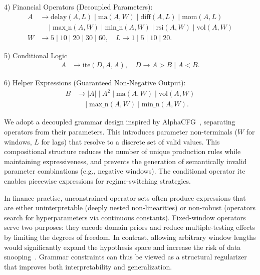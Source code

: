 4) Financial Operators (Decoupled Parameters):
\begin{align}
\mathit{A} &\rightarrow \text{delay}(\mathit{A}, \mathit{L}) \mid \text{ma}(\mathit{A}, \mathit{W}) \mid \text{diff}(\mathit{A}, \mathit{L}) \mid \text{mom}(\mathit{A}, \mathit{L}) \nonumber \\
&\quad \mid \text{max\_n}(\mathit{A}, \mathit{W}) \mid \text{min\_n}(\mathit{A}, \mathit{W}) \mid \text{rsi}(\mathit{A}, \mathit{W}) \mid \text{vol}(\mathit{A}, \mathit{W}) \\
\mathit{W} &\rightarrow 5 \mid 10 \mid 20 \mid 30 \mid 60, \quad \mathit{L} \rightarrow 1 \mid 5 \mid 10 \mid 20.
\end{align}

5) Conditional Logic
\begin{align}
\mathit{A} &\rightarrow \text{ite}(\mathit{D}, \mathit{A}, \mathit{A}), \quad \mathit{D} \rightarrow \mathit{A} > \mathit{B} \mid \mathit{A} < \mathit{B}.
\end{align}

6) Helper Expressions (Guaranteed Non-Negative Output):
\begin{align}
\mathit{B} &\rightarrow |\mathit{A}| \mid \mathit{A}^{2} \mid \text{ma}(\mathit{A}, \mathit{W}) \mid \text{vol}(\mathit{A}, \mathit{W}) \nonumber \\
&\quad \mid \text{max\_n}(\mathit{A}, \mathit{W}) \mid \text{min\_n}(\mathit{A}, \mathit{W}).
\end{align}

We adopt a decoupled grammar design inspired by AlphaCFG~\cite{yang2026alpha}, separating operators from their parameters. This introduces parameter non-terminals ($\mathit{W}$ for windows, $\mathit{L}$ for lags) that resolve to a discrete set of valid values. This compositional structure reduces the number of unique production rules while maintaining expressiveness, and prevents the generation of semantically invalid parameter combinations (e.g., negative windows). The conditional operator $\text{ite}$ enables piecewise expressions for regime-switching strategies.

In finance practise, unconstrained operator sets often produce expressions that are either uninterpretable (deeply nested non-linearities) or non-robust (operators search for hyperparameters via continuous constants). Fixed-window operators serve two purposes: they encode domain priors and reduce multiple-testing effects by limiting the degrees of freedom. In contrast, allowing arbitrary window lengths would significantly expand the hypothesis space and increase the risk of data snooping~\cite{white2000reality_check,bailey2014deflated_sharpe}. Grammar constraints can thus be viewed as a structural regularizer that improves both interpretability and generalization.

